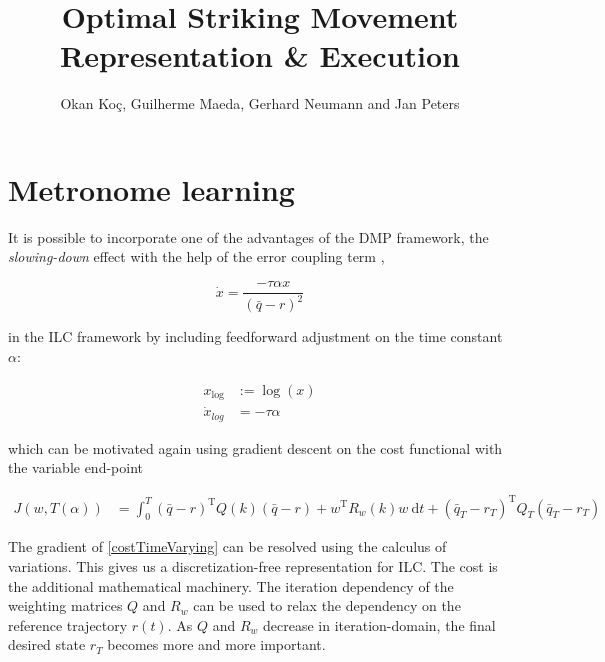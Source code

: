 \documentclass[10pt,a4paper]{article}
\author{Okan Ko\c c, Guilherme Maeda, Gerhard Neumann and Jan Peters}
\title{Optimal Striking Movement Representation \& Execution}
\newcommand{\joint}{q} %
\newcommand{\state}{\bar{\joint}} %
\newcommand{\traj}{r} %
\newcommand{\phase}{x} %
\newcommand{\weights}{w} %
\begin{document}
\maketitle


\section{Metronome learning}


It is possible to incorporate one of the advantages of the DMP framework, the \emph{slowing-down} effect with the help of the error coupling term \cite{Schaal07}, \cite{Ijspeert13}

\begin{equation}
\dot{\phase} = \frac{-\tau\alpha\phase}{(\state - \traj)^2}
\label{phaseWithErrorCoupling}
\end{equation}

in the ILC framework by including feedforward adjustment on the time constant $\alpha$:

\begin{equation}
\begin{aligned}
\phase_{\log} &:= \log(\phase) \\
\dot{\phase}_{log} &= -\tau\alpha
\label{logPhase}
\end{aligned}
\end{equation}

which can be motivated again using gradient descent on the cost functional with the variable end-point

\begin{equation}
\begin{aligned}
J(\weights,T(\alpha)) &= \int_{0}^{T} (\state - \traj)^{\mathrm{T}}Q(k)(\state - \traj) + \weights^{\mathrm{T}}R_w(k)\weights \ \mathrm{d}t + (\state_T-\traj_T)^{\mathrm{T}}Q_{T}(\state_T-\traj_T) 
\end{aligned}
\label{costTimeVarying}
\end{equation}

The gradient of \eqref{costTimeVarying} can be resolved using the calculus of variations. This gives us a discretization-free representation for ILC. The cost is the additional mathematical machinery. The iteration dependency of the weighting matrices $Q$ and $R_{\weights}$ can be used to relax the dependency on the reference trajectory $\traj(t)$. As $Q$ and $R_{\weights}$ decrease in iteration-domain, the final desired state $\traj_{T}$ becomes more and more important.
\end{document}
